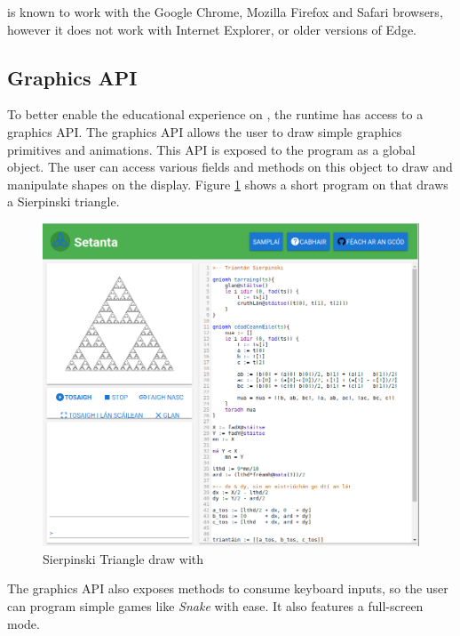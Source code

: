 \trys{} is known to work with the Google Chrome, Mozilla Firefox and Safari browsers, however it does not work with Internet Explorer, or older versions of Edge.

\subsection{Graphics API}

To better enable the educational experience on \trys{}, the \Setanta{} runtime has access to a graphics API. The graphics API allows the user to draw simple graphics primitives and animations. This API is exposed to the \Setanta{} program as a global object. The user can access various fields and methods on this object to draw and manipulate shapes on the display. Figure \ref{sierpinksitriangle} shows a short program on \trys{} that draws a Sierpinski triangle.

\begin{figure}
    \caption{Sierpinski Triangle draw with \Setanta{}}
    \label{sierpinksitriangle}
    \begin{center}
    \includegraphics[scale=0.45]{sierpinskitriangle}
    \end{center}
\end{figure}

The graphics API also exposes methods to consume keyboard inputs, so the user can program simple games like \emph{Snake} with ease. It also features a full-screen mode.

